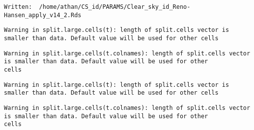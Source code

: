 \documentclass[
  10pt,
  a4paper,oneside]{article}
\newenvironment{Shaded}{\begin{snugshade}}{\end{snugshade}}
\newcommand{\CharTok}[1]{\textcolor[rgb]{0.31,0.60,0.02}{#1}}
\newcommand{\CommentTok}[1]{\textcolor[rgb]{0.56,0.35,0.01}{\textit{#1}}}
\newcommand{\KeywordTok}[1]{\textcolor[rgb]{0.13,0.29,0.53}{\textbf{#1}}}
\newcommand{\NormalTok}[1]{#1}
\newcommand{\OperatorTok}[1]{\textcolor[rgb]{0.81,0.36,0.00}{\textbf{#1}}}
\newcommand{\StringTok}[1]{\textcolor[rgb]{0.31,0.60,0.02}{#1}}
\begin{document}
\begin{Shaded}
\end{Shaded}

\begin{verbatim}
Written:  /home/athan/CS_id/PARAMS/Clear_sky_id_Reno-Hansen_apply_v14_2.Rds 
\end{verbatim}

\begin{verbatim}
Warning in split.large.cells(t): length of split.cells vector is smaller than data. Default value will be used for other cells
\end{verbatim}

\begin{verbatim}
Warning in split.large.cells(t.colnames): length of split.cells vector is smaller than data. Default value will be used for other
cells
\end{verbatim}

\begin{verbatim}
Warning in split.large.cells(t): length of split.cells vector is smaller than data. Default value will be used for other cells
\end{verbatim}

\begin{verbatim}
Warning in split.large.cells(t.colnames): length of split.cells vector is smaller than data. Default value will be used for other
cells
\end{verbatim}
\end{document}
